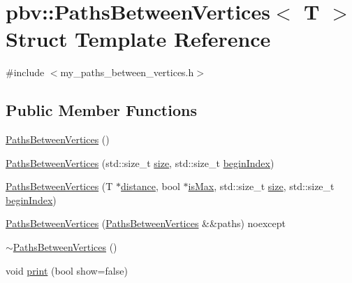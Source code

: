 \hypertarget{structpbv_1_1_paths_between_vertices}{}\section{pbv\+:\+:Paths\+Between\+Vertices$<$ T $>$ Struct Template Reference}
\label{structpbv_1_1_paths_between_vertices}


{\ttfamily \#include $<$my\+\_\+paths\+\_\+between\+\_\+vertices.\+h$>$}

\subsection*{Public Member Functions}
\begin{DoxyCompactItemize}
\item 
\mbox{\hyperlink{structpbv_1_1_paths_between_vertices_ab9812924cc3075c7501dd17d5a4f4d9c}{Paths\+Between\+Vertices}} ()
\item 
\mbox{\hyperlink{structpbv_1_1_paths_between_vertices_a352d3e86d9e9776ad7c9ec69844d5651}{Paths\+Between\+Vertices}} (std\+::size\+\_\+t \mbox{\hyperlink{structpbv_1_1_paths_between_vertices_a7ffee986b1b7f57a881a883b58bc67f4}{size}}, std\+::size\+\_\+t \mbox{\hyperlink{structpbv_1_1_paths_between_vertices_abf43c3771ed161bb80a73fe39e5cc916}{begin\+Index}})
\item 
\mbox{\hyperlink{structpbv_1_1_paths_between_vertices_a774e36d73a973b9e301e4dbce74b7b29}{Paths\+Between\+Vertices}} (T $\ast$\mbox{\hyperlink{structpbv_1_1_paths_between_vertices_a67aed042aa649d2b6dfeee29d3ec6416}{distance}}, bool $\ast$\mbox{\hyperlink{structpbv_1_1_paths_between_vertices_a8d7391a03771f17ca699f519e64bf2a4}{is\+Max}}, std\+::size\+\_\+t \mbox{\hyperlink{structpbv_1_1_paths_between_vertices_a7ffee986b1b7f57a881a883b58bc67f4}{size}}, std\+::size\+\_\+t \mbox{\hyperlink{structpbv_1_1_paths_between_vertices_abf43c3771ed161bb80a73fe39e5cc916}{begin\+Index}})
\item 
\mbox{\hyperlink{structpbv_1_1_paths_between_vertices_a7b7fadc0fedb587ae9b7deb62ebb6a1c}{Paths\+Between\+Vertices}} (\mbox{\hyperlink{structpbv_1_1_paths_between_vertices}{Paths\+Between\+Vertices}} \&\&paths) noexcept
\item 
\mbox{\hyperlink{structpbv_1_1_paths_between_vertices_a6be9fce23ff701beaf2a44006bd19e5b}{$\sim$\+Paths\+Between\+Vertices}} ()
\item 
void \mbox{\hyperlink{structpbv_1_1_paths_between_vertices_aca6583521b4e35eec9db20c901f200e6}{print}} (bool show=false)
\end{DoxyCompactItemize}
